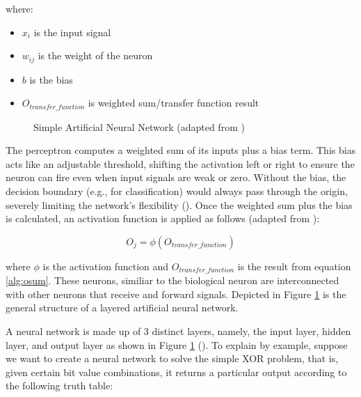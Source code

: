 \noindent where:
\begin{itemize}
    \item $x_{i}$ is the input signal
    \item $w_{ij}$ is the weight of the neuron
    \item $b$ is the bias
    \item $O_{transfer\_function}$ is weighted sum/transfer function result
\end{itemize}

\parbreak
\begin{figure}[H] %
    \centering %
    \caption{Simple Artificial Neural Network (adapted from \cite{nielsen2015neural})}
    \label{fig:ne_simple_neural_network} %
\end{figure}

\parbreak\noindent The perceptron computes a weighted sum of its inputs plus a bias term. This bias acts like an adjustable threshold, shifting the activation left or right to ensure the neuron can fire even when input signals are weak or zero. Without the bias, the decision boundary (e.g., for classification) would always pass through the origin, severely limiting the network's flexibility (\cite{importance_of_bias}). Once the weighted sum plus the bias is calculated, an activation function is applied as follows (adapted from \cite{suzuki2011artificial}):
\begin{ceqn}
    \begin{equation}
        O_j = \phi(O_{transfer\_function})
    \end{equation}
\end{ceqn}

\noindent where $\phi$ is the activation function and $O_{transfer\_function}$ is the result from equation \ref{alg:osum}. These neurons, similiar to the biological neuron are interconnected with other neurons that receive and forward signals. Depicted in Figure \ref{fig:ne_simple_neural_network} is the general structure of a layered artificial neural network.

\parbreak\noindent A neural network is made up of 3 distinct layers, namely, the input layer, hidden layer, and output layer as shown in Figure \ref{fig:ne_simple_neural_network} (\cite{nielsen2015neural}). To explain by example, suppose we want to create a neural network to solve the simple XOR problem, that is, given certain bit value combinations, it returns a particular output according to the following truth table:

